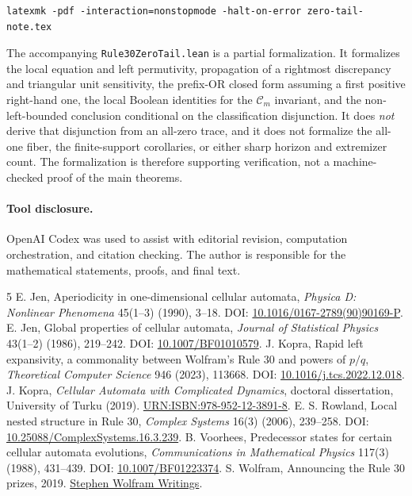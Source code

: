 \documentclass[11pt]{article}
\begin{document}
\begin{verbatim}
latexmk -pdf -interaction=nonstopmode -halt-on-error zero-tail-note.tex
\end{verbatim}

The accompanying \texttt{Rule30ZeroTail.lean} is a partial formalization.  It
formalizes the local equation and left permutivity, propagation of a rightmost
discrepancy and triangular unit sensitivity, the prefix-OR closed form assuming
a first positive right-hand one, the local Boolean identities for the
$\mathcal C_m$ invariant, and the non-left-bounded conclusion conditional on
the classification disjunction.  It does \emph{not} derive that disjunction from
an all-zero trace, and it does not formalize the all-one fiber, the finite-support
corollaries, or either sharp horizon and extremizer count.  The formalization is
therefore supporting verification, not a machine-checked proof of the main
theorems.

\paragraph{Tool disclosure.}
OpenAI Codex was used to assist with editorial revision, computation
orchestration, and citation checking.  The author is responsible for the
mathematical statements, proofs, and final text.

\begin{thebibliography}{5}\footnotesize
\setlength{\itemsep}{1pt}\setlength{\parskip}{0pt}
 E. Jen, Aperiodicity in one-dimensional cellular automata,
\emph{Physica D: Nonlinear Phenomena} 45(1--3) (1990), 3--18.
DOI: \href{https://doi.org/10.1016/0167-2789(90)90169-P}{10.1016/0167-2789(90)90169-P}.
 E. Jen, Global properties of cellular automata,
\emph{Journal of Statistical Physics} 43(1--2) (1986), 219--242.
DOI: \href{https://doi.org/10.1007/BF01010579}{10.1007/BF01010579}.
 J. Kopra, Rapid left expansivity, a commonality between
Wolfram's Rule 30 and powers of $p/q$, \emph{Theoretical Computer Science}
946 (2023), 113668.
DOI: \href{https://doi.org/10.1016/j.tcs.2022.12.018}{10.1016/j.tcs.2022.12.018}.
 J. Kopra, \emph{Cellular Automata with Complicated
Dynamics}, doctoral dissertation, University of Turku (2019).
\href{https://urn.fi/URN:ISBN:978-952-12-3891-8}{URN:ISBN:978-952-12-3891-8}.
 E. S. Rowland, Local nested structure in Rule 30,
\emph{Complex Systems} 16(3) (2006), 239--258.
DOI: \href{https://doi.org/10.25088/ComplexSystems.16.3.239}{10.25088/ComplexSystems.16.3.239}.
 B. Voorhees, Predecessor states for certain cellular
automata evolutions, \emph{Communications in Mathematical Physics} 117(3)
(1988), 431--439.
DOI: \href{https://doi.org/10.1007/BF01223374}{10.1007/BF01223374}.
 S. Wolfram, Announcing the Rule 30 prizes, 2019.
\href{https://writings.stephenwolfram.com/2019/10/announcing-the-rule-30-prizes/}
{Stephen Wolfram Writings}.
\end{thebibliography}
\end{document}
